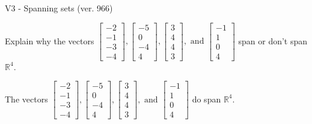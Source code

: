 \begin{exercise}
  \begin{exerciseTitle}V3 - Spanning sets (ver. 966)\end{exerciseTitle}
  \begin{exerciseStatement}
    Explain why the vectors \(\left[\begin{array}{r}
-2 \\
-1 \\
-3 \\
-4
\end{array}\right] , \left[\begin{array}{r}
-5 \\
0 \\
-4 \\
4
\end{array}\right] , \left[\begin{array}{r}
3 \\
4 \\
4 \\
3
\end{array}\right] , \text{ and } \left[\begin{array}{r}
-1 \\
1 \\
0 \\
4
\end{array}\right]\) span or don't span \(\mathbb{R}^4\). 
	


  \end{exerciseStatement}
  \begin{exerciseAnswer}
   The vectors \(\left[\begin{array}{r}
-2 \\
-1 \\
-3 \\
-4
\end{array}\right] , \left[\begin{array}{r}
-5 \\
0 \\
-4 \\
4
\end{array}\right] , \left[\begin{array}{r}
3 \\
4 \\
4 \\
3
\end{array}\right] , \text{ and } \left[\begin{array}{r}
-1 \\
1 \\
0 \\
4
\end{array}\right]\) 
  	 do  
	span \(\mathbb{R}^4\).
  


  \end{exerciseAnswer}
\end{exercise}